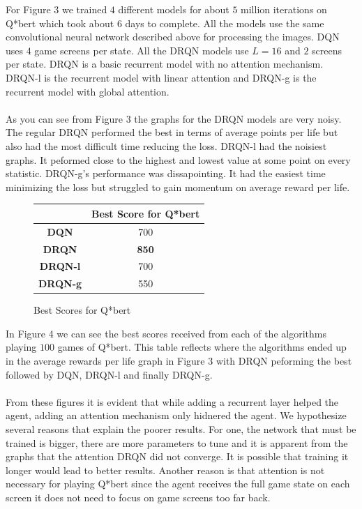 \documentclass{article}
\begin{document}
For Figure 3 we trained $4$ different models for about $5$ million iterations on
Q*bert which took about $6$ days to complete. All the models use the same
convolutional neural network described above for processing the images. DQN uses
$4$ game screens per state. All the DRQN models use $L=16$ and $2$ screens per
state. DRQN is a basic recurrent model with no attention mechanism. DRQN-l is the
recurrent model with linear attention and DRQN-g is the recurrent model with
global attention. \\
\\
As you can see from Figure 3 the graphs for the DRQN models are very noisy. The
regular DRQN performed the best in terms of average points per life but also had
the most difficult time reducing the loss. DRQN-l had the noisiest graphs. It
peformed close to the highest and lowest value at some point on every statistic.
DRQN-g's performance was dissapointing. It had the easiest time minimizing the loss
but struggled to gain momentum on average reward per life. \\

\begin{figure}[h]
    \begin{center}
        \begin{tabular}{| c | c |}
            \hline
            & \textbf{Best Score for Q*bert} \\ \hline
            \textbf{DQN} & 700 \\ \hline 
            \textbf{DRQN} & \textbf{850} \\ \hline
            \textbf{DRQN-l} & 700 \\ \hline
            \textbf{DRQN-g} & 550 \\ \hline
        \end{tabular}
    \end{center}
    \caption{Best Scores for Q*bert}
\end{figure}

In Figure 4 we can see the best scores received from each of the algorithms playing
$100$ games of Q*bert. This table reflects where the algorithms ended up in the
average rewards per life graph in Figure 3 with DRQN peforming the best followed
by DQN, DRQN-l and finally DRQN-g. \\
\\
From these figures it is evident that while adding a recurrent layer helped the
agent, adding an attention mechanism only hidnered the agent. We hypothesize
several reasons that explain the poorer results. For one, the network that must
be trained is bigger, there are more parameters to tune and it is apparent from
the graphs that the attention DRQN did not converge. It is possible that training
it longer would lead to better results. Another reason is that attention is not
necessary for playing Q*bert since the agent receives the full game state on each
screen it does not need to focus on game screens too far back.
\end{document}
